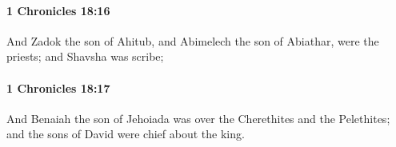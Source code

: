 		\paragraph{1 Chronicles 18:16} %
			\label{1CHRONICLES-18-16}

			And Zadok the son of Ahitub, and Abimelech the son of Abiathar, were the priests; and Shavsha was scribe;


		\paragraph{1 Chronicles 18:17} %
			\label{1CHRONICLES-18-17}

			And Benaiah the son of Jehoiada was over the Cherethites and the Pelethites; and the sons of David were chief about the king.


